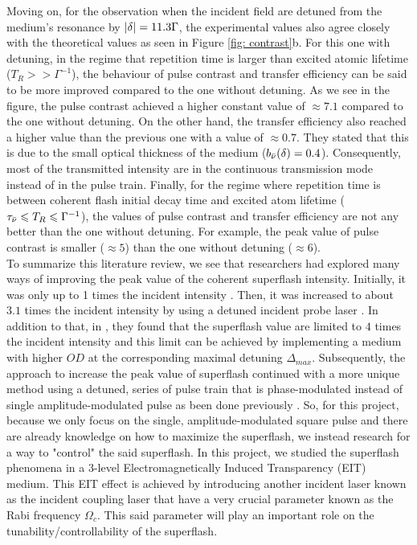 Moving on, for the observation when the incident field are detuned from the medium's resonance by $\abs{\delta} = 11.3 \Gamma$, the experimental values also agree closely with the theoretical values as seen in Figure \ref{fig: contrast}b. For this one with detuning, in the regime that repetition time is larger than excited atomic lifetime ($T_{R} >> \Gamma^{-1}$), the behaviour of pulse contrast and transfer efficiency can be said to be more improved compared to the one without detuning. As we see in the figure, the pulse contrast achieved a higher constant value of $\approx 7.1$ compared to the one without detuning. On the other hand, the transfer efficiency also reached a higher value than the previous one with a value of $\approx 0.7$. They stated that this is due to the small optical thickness of the medium ($b_{\Bar{\nu}}(\delta) = 0.4$). Consequently, most of the transmitted intensity are in the continuous transmission mode instead of in the pulse train. Finally, for the regime where repetition time is between coherent flash initial decay time and excited atom lifetime ($\tau_{\Bar{\nu}} \leqslant T_{R} \leqslant \Gamma^{-1}$), the values of pulse contrast and transfer efficiency are not any better than the one without detuning. For example, the peak value of pulse contrast is smaller ($\approx 5$) than the one without detuning ($\approx 6$).\\

To summarize this literature review, we see that researchers had explored many ways of improving the peak value of the coherent superflash intensity. Initially, it was only up to 1 times the incident intensity \cite{Chalony2011}. Then, it was increased to about $3.1$ times the incident intensity by using a detuned incident probe laser \cite{Kwong2014}. In addition to that, in \cite{Kwong2014}, they found that the superflash value are limited to $4$ times the incident intensity and this limit can be achieved by implementing a medium with higher $OD$ at the corresponding maximal detuning $\Delta_{max}$. Subsequently, the approach to increase the peak value of superflash continued with a more unique method using a detuned, series of pulse train that is phase-modulated \cite{Kwong2015} instead of single amplitude-modulated pulse as been done previously \cite{Chalony2011, Kwong2014}. So, for this project, because we only focus on the single, amplitude-modulated square pulse and there are already knowledge on how to maximize the superflash, we instead research for a way to "control" the said superflash. In this project, we studied the superflash phenomena in a 3-level Electromagnetically Induced Transparency (EIT) medium. This EIT effect is achieved by introducing another incident laser known as the incident coupling laser that have a very crucial parameter known as the Rabi frequency $\Omega_{c}$. This said parameter will play an important role on the tunability/controllability of the superflash.

